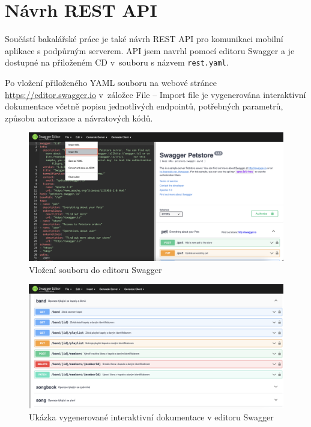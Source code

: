 \chapter{Návrh REST API}

Součástí bakalářské práce je také návrh REST API pro komunikaci mobilní aplikace s podpůrným serverem. API jsem navrhl pomocí editoru Swagger \cite{swagger} a je dostupné na přiloženém CD v~souboru s názvem \texttt{rest.yaml}.

Po vložení přiloženého YAML souboru na webové stránce \url{https://editor.swagger.io} v~záložce File -- Import file je vygenerována interaktivní dokumentace včetně popisu jednotlivých endpointů, potřebných parametrů, způsobu autorizace a návratových kódů.

\vspace*{1in}

\begin{figure}[H]
    \includegraphics[width=\textwidth]{images/A-navrh-api/A-1-swagger-import.png}
    \caption{Vložení souboru do editoru Swagger}
\end{figure}

\begin{figure}
    \includegraphics[width=\textwidth]{images/A-navrh-api/A-2-swagger-dokumentace.png}
    \caption{Ukázka vygenerované interaktivní dokumentace v editoru Swagger}
\end{figure}

